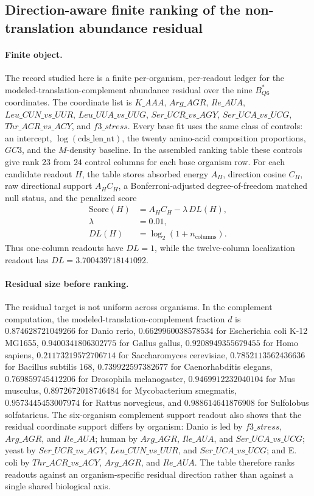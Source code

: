 \subsection{Direction-aware finite ranking of the non-translation abundance residual}
\label{sec:q6-h-ranking-table-direction-aware-cross-layer}

\paragraph{Finite object.}
The record studied here is a finite per-organism, per-readout ledger for the modeled-translation-complement abundance residual over the nine $B^{\ast}_{Q6}$ coordinates.  The coordinate list is $K\_AAA$, $Arg\_AGR$, $Ile\_AUA$, $Leu\_CUN\_vs\_UUR$, $Leu\_UUA\_vs\_UUG$, $Ser\_UCR\_vs\_AGY$, $Ser\_UCA\_vs\_UCG$, $Thr\_ACR\_vs\_ACY$, and $f3\_stress$.  Every base fit uses the same class of controls: an intercept, $\log(\mathrm{cds\_len\_nt})$, the twenty amino-acid composition proportions, $GC3$, and the $M$-density baseline.  In the assembled ranking table these controls give rank $23$ from $24$ control columns for each base organism row.  For each candidate readout $H$, the table stores absorbed energy $A_H$, direction cosine $C_H$, raw directional support $A_H C_H$, a Bonferroni-adjusted degree-of-freedom matched null status, and the penalized score
$$
\begin{aligned}
\mathrm{Score}(H) &= A_H C_H - \lambda\,DL(H),\\
\lambda &= 0.01,\\
DL(H) &= \log_2(1+n_{\mathrm{columns}}).
\end{aligned}
$$
Thus one-column readouts have $DL=1$, while the twelve-column localization readout has $DL=3.700439718141092$.

\paragraph{Residual size before ranking.}
The residual target is not uniform across organisms.  In the complement computation, the modeled-translation-complement fraction $d$ is $0.874628721049266$ for Danio rerio, $0.6629960038578534$ for Escherichia coli K-12 MG1655, $0.9400341806302775$ for Gallus gallus, $0.9208949355679455$ for Homo sapiens, $0.21173219572706714$ for Saccharomyces cerevisiae, $0.7852113562436636$ for Bacillus subtilis 168, $0.739922597382677$ for Caenorhabditis elegans, $0.769859745412206$ for Drosophila melanogaster, $0.9469912232040104$ for Mus musculus, $0.8972672018746484$ for Mycobacterium smegmatis, $0.9573445453007974$ for Rattus norvegicus, and $0.988614641876908$ for Sulfolobus solfataricus.  The six-organism complement support readout also shows that the residual coordinate support differs by organism: Danio is led by $f3\_stress$, $Arg\_AGR$, and $Ile\_AUA$; human by $Arg\_AGR$, $Ile\_AUA$, and $Ser\_UCA\_vs\_UCG$; yeast by $Ser\_UCR\_vs\_AGY$, $Leu\_CUN\_vs\_UUR$, and $Ser\_UCA\_vs\_UCG$; and E. coli by $Thr\_ACR\_vs\_ACY$, $Arg\_AGR$, and $Ile\_AUA$.  The table therefore ranks readouts against an organism-specific residual direction rather than against a single shared biological axis.

